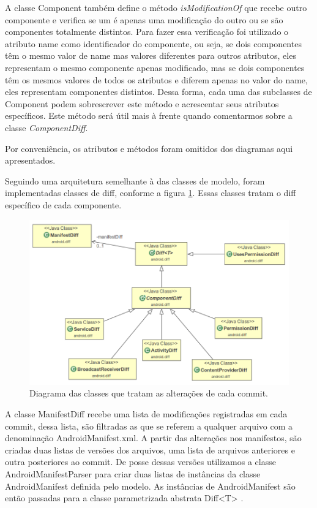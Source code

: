 \documentclass[a4paper,12pt]{article}
\begin{document}
A classe Component também define o método \textit{isModificationOf} que recebe outro componente e verifica se um é apenas uma modificação do outro ou se são componentes totalmente distintos. Para fazer essa verificação foi utilizado o atributo name como identificador do componente, ou seja, se dois componentes têm o mesmo valor de name mas valores diferentes para outros atributos, eles representam o mesmo componente apenas modificado, mas se dois componentes têm os mesmos valores de todos os atributos e diferem apenas no valor do name, eles representam componentes distintos. Dessa forma, cada uma das subclasses de Component podem sobrescrever este método e acrescentar seus atributos específicos. Este método será útil mais à frente quando comentarmos sobre a classe \textit{ComponentDiff}.

Por conveniência, os atributos e métodos foram omitidos dos diagramas aqui apresentados. %


Seguindo uma arquitetura semelhante à das classes de modelo, foram implementadas classes de diff, conforme a figura \ref{fig:diff}. Essas classes tratam o diff específico de cada componente. \\


\begin{figure}[h]
\centering
\includegraphics[width=0.8\linewidth]{imgs/diff.png}
\caption{Diagrama das classes que tratam as alterações de cada commit.}
\label{fig:diff}
\end{figure}


A classe ManifestDiff recebe uma lista de modificações registradas em cada commit, dessa lista, são filtradas as que se referem a qualquer arquivo com a denominação AndroidManifest.xml. A partir das alterações  nos manifestos, são criadas duas listas de versões dos arquivos, uma lista de arquivos anteriores e outra posteriores ao commit. De posse dessas versões utilizamos a classe AndroidManifestParser para criar duas listas de instâncias da classe AndroidManifest definida pelo modelo. As instâncias de AndroidManifest são então passadas para a classe parametrizada abstrata Diff<T> . \\
\end{document}

